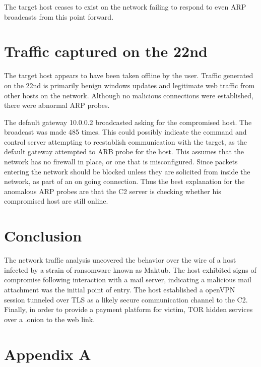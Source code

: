 \documentclass[11pt]{diazessay} %
\begin{document}
The target host ceases to exist on the network failing to respond to even ARP broadcasts from this point forward. 


\section*{Traffic captured on the 22nd}

The target host appears to have been taken offline by the user. Traffic generated on the 22nd is primarily benign windows updates and legitimate web traffic from other hosts on the network. Although no malicious connections were established, there were abnormal ARP probes.

The default gateway 10.0.0.2 broadcasted asking for the compromised host. The broadcast was made 485 times. This could possibly indicate the command and control server attempting to reestablish communication with the target, as the default gateway attempted to ARB probe for the host. This assumes that the network has no firewall in place, or one that is misconfigured. Since packets entering the network should be blocked unless they are solicited from inside the network, as part of an on going connection. Thus the best explanation for the anomalous ARP probes are that the C2 server is checking whether his compromised host are still online.




\section*{Conclusion}

The network traffic analysis uncovered the behavior over the wire of a host infected by a strain of ransomware known as Maktub. The host exhibited signs of compromise following interaction with a mail server, indicating a malicious mail attachment was the initial point of entry. The host established a openVPN session tunneled over TLS as a likely secure communication channel to the C2. Finally, in order to provide a payment platform for victim, TOR hidden services over a .onion to the web link.


\clearpage
%



\pagebreak
\section*{Appendix A}


\end{document}

